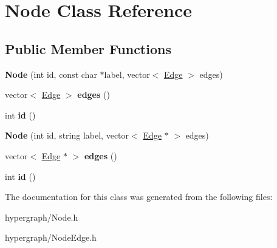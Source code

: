 \hypertarget{classNode}{
\section{Node Class Reference}
\label{classNode}
}
\subsection*{Public Member Functions}
\begin{DoxyCompactItemize}
\item 
\hypertarget{classNode_aab9f64d61ba1d5a93482922d894517b0}{
{\bfseries Node} (int id, const char $\ast$label, vector$<$ \hyperlink{classEdge}{Edge} $>$ edges)}
\label{classNode_aab9f64d61ba1d5a93482922d894517b0}

\item 
\hypertarget{classNode_a3ed601625954b6ae5f59e414846ccd8e}{
vector$<$ \hyperlink{classEdge}{Edge} $>$ {\bfseries edges} ()}
\label{classNode_a3ed601625954b6ae5f59e414846ccd8e}

\item 
\hypertarget{classNode_a272f2e896143233a009d2f1ac48a27d8}{
int {\bfseries id} ()}
\label{classNode_a272f2e896143233a009d2f1ac48a27d8}

\item 
\hypertarget{classNode_ab07ee1f35978d263f84619cf5cd59ffb}{
{\bfseries Node} (int id, string label, vector$<$ \hyperlink{classEdge}{Edge} $\ast$ $>$ edges)}
\label{classNode_ab07ee1f35978d263f84619cf5cd59ffb}

\item 
\hypertarget{classNode_adee8ea2ba28fde52191d10c1fea5ce4c}{
vector$<$ \hyperlink{classEdge}{Edge} $\ast$ $>$ {\bfseries edges} ()}
\label{classNode_adee8ea2ba28fde52191d10c1fea5ce4c}

\item 
\hypertarget{classNode_a272f2e896143233a009d2f1ac48a27d8}{
int {\bfseries id} ()}
\label{classNode_a272f2e896143233a009d2f1ac48a27d8}

\end{DoxyCompactItemize}


The documentation for this class was generated from the following files:\begin{DoxyCompactItemize}
\item 
hypergraph/Node.h\item 
hypergraph/NodeEdge.h\end{DoxyCompactItemize}
